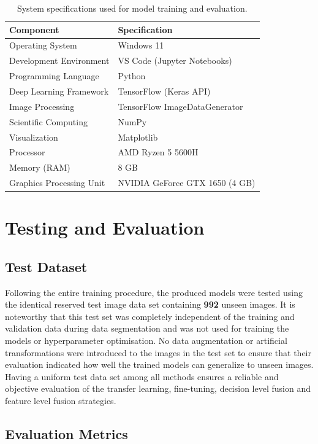 \begin{table}[H]
\centering
\begin{tabular}{|l|l|}
\hline
\textbf{Component} & \textbf{Specification} \\ \hline
Operating System & Windows 11 \\ \hline
Development Environment & VS Code (Jupyter Notebooks) \\ \hline
Programming Language & Python \\ \hline
Deep Learning Framework & TensorFlow (Keras API) \\ \hline
Image Processing & TensorFlow ImageDataGenerator \\ \hline
Scientific Computing & NumPy \\ \hline
Visualization & Matplotlib \\ \hline
Processor & AMD Ryzen 5 5600H \\ \hline
Memory (RAM) & 8 GB \\ \hline
Graphics Processing Unit & NVIDIA GeForce GTX 1650 (4 GB) \\ \hline
\end{tabular}
\caption{System specifications used for model training and evaluation.}
\label{tab:environment}
\end{table}

\section{Testing and Evaluation}
\subsection{Test Dataset}
Following the entire training procedure, the produced models were tested using the identical reserved test image data set containing \textbf{992} unseen images. It is noteworthy that this test set was completely independent of the training and validation data during data segmentation and was not used for training the models or hyperparameter optimisation. No data augmentation or artificial transformations were introduced to the images in the test set to ensure that their evaluation indicated how well the trained models can generalize to unseen images. Having a uniform test data set among all methods ensures a reliable and objective evaluation of the transfer learning, fine-tuning, decision level fusion and feature level fusion strategies.

\subsection{Evaluation Metrics}

